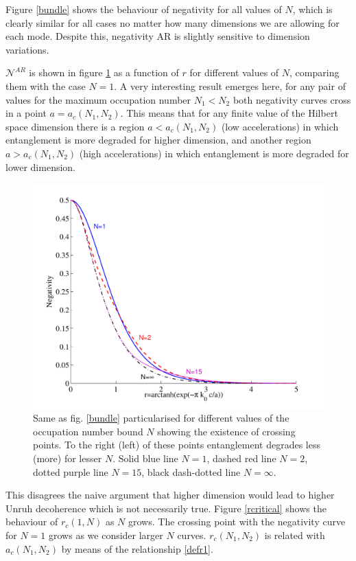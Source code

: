 Figure \ref{bundle} shows the behaviour of negativity for all values of $N$, which is clearly similar for all cases no matter how many dimensions we are allowing for each mode. Despite this, negativity AR is slightly sensitive to dimension variations.

$\mathcal{N}^{AR}$ is shown in figure \ref{negaARcomp} as a function of $r$ for different values of $N$, comparing them with the case $N=1$. 
A very interesting result emerges here, for any pair of values for the maximum occupation number $N_1<N_2$ both negativity curves cross in a point $a=a_c(N_1,N_2)$. This means that for any finite value of the Hilbert space dimension there is a region $a<a_c(N_1,N_2)$ (low accelerations) in which entanglement is more degraded for higher dimension, and another region $a>a_c(N_1,N_2)$ (high accelerations)  in which entanglement is more degraded for lower dimension.
\begin{figure}[h]
\begin{center}
\includegraphics[width=.85\textwidth]{negaARcomp}
\end{center}
\caption{Same as fig. \ref{bundle} particularised for different values of the occupation number bound $N$ showing the existence of crossing points. To the right (left) of these points entanglement degrades less (more) for lesser $N$. Solid blue line $N=1$, dashed red line $N=2$, dotted purple line $N=15$, black dash-dotted line $N=\infty$.}
\label{negaARcomp}
\end{figure}

This disagrees the naive argument that higher dimension would lead to higher Unruh decoherence which is not necessarily true. Figure \ref{rcritical} shows the behaviour of $r_c(1,N)$ as $N$ grows. The crossing point with the negativity curve for $N=1$ grows as we consider larger $N$ curves. $r_c(N_1,N_2)$ is related with $a_c(N_1,N_2)$ by means of the relationship \eqref{defr1}.

